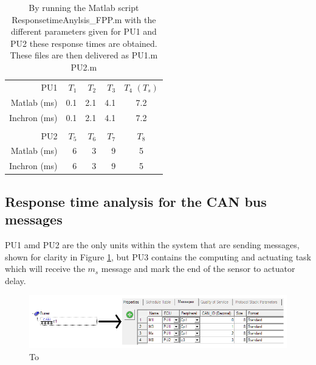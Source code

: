 \begin{table}[htbp!]
	\centering
	\caption{By running the Matlab script ResponsetimeAnylsis\_FPP.m with the different parameters given for PU1 and PU2 these response times are obtained. These files are then delivered as PU1.m PU2.m}
	\begin{tabular}{rrrrc}
		& & & & \\
		\toprule
		PU1     & $T_1$    & $T_2$    & $T_3$    & $T_4$  $(T_s)$ \\
		\midrule
		Matlab (ms)      & 0.1     & 2.1     & 4.1     & 7.2 \\
		Inchron (ms)	& 0.1     & 2.1     & 4.1     & 7.2 \\
		
		& & & & \\
		\toprule
		PU2     & $T_5$    & $T_6$    & $T_7$    & $T_8$ \\
		\midrule
		Matlab (ms)      & 6       & 3       & 9       & 5 \\
		Inchron (ms)	 & 6       & 3       & 9       & 5 \\
		
	\end{tabular}%
	\label{tab:addlabel}%
\end{table}%



\subsection{ Response time analysis for the CAN bus messages}

PU1 amd PU2 are the only units within the system that are sending messages, shown for clarity in Figure \ref{fig:msgCAN}, but PU3 contains the computing and actuating task which will receive the $m_s$ message and mark the end of the sensor to actuator delay.

\begin{figure}[h!]
	\begin{center}
		\includegraphics[width=\linewidth]{img/msgCAN}
		\caption{To }
		\label{fig:msgCAN}
	\end{center}
\end{figure}

